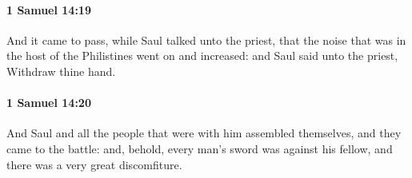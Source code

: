 		\paragraph{1 Samuel 14:19} %
			\label{1SAMUEL-14-19}

			And it came to pass, while Saul talked unto the priest, that the noise that was in the host of the Philistines went on and increased: and Saul said unto the priest, Withdraw thine hand.


		\paragraph{1 Samuel 14:20} %
			\label{1SAMUEL-14-20}

			And Saul and all the people that were with him assembled themselves, and they came to the battle: and, behold, every man’s sword was against his fellow, and there was a very great discomfiture.

